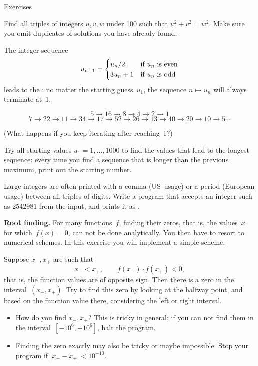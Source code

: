  {Exercises}

\begin{exercise}
  \label{ex:pythagoras}
  Find all triples of integers $u,v,w$ under 100 such that
  $u^2+v^2=w^2$. Make sure you omit duplicates of solutions you have
  already found.
\end{exercise}

\begin{exercise}
  \label{ex:collatz}
  The integer sequence
  \[ u_{n+1} = 
  \begin{cases}
    u_n/2&\hbox{if $u_n$ is even}\\
    3u_n+1&\hbox{if $u_n$ is odd}\\
  \end{cases}
  \]
  leads to the : no matter the starting guess~$u_1$,
  the sequence $n\mapsto u_n$ will always terminate at~1.

  { \small
  \[ 5\rightarrow 16\rightarrow 8\rightarrow 4\rightarrow 2\rightarrow 1\]
  \[ 7\rightarrow 22\rightarrow 11\rightarrow 34\rightarrow
  17\rightarrow 52\rightarrow 26\rightarrow 13\rightarrow
  40\rightarrow 20\rightarrow 10\rightarrow 5\cdots \]
  }

  (What happens if you keep iterating after reaching~1?)
  
  Try all starting values $u_1=1,\ldots,1000$ to find the values that
  lead to the longest sequence: every time you find a sequence that is
  longer than the previous maximum, print out the starting number.
\end{exercise}

\begin{exercise}
  \label{ex:mille-comma}
  Large integers are often printed with a comma (US~usage) or a period
  (European usage) between all triples of digits. Write a program that
  accepts an integer such as $2542981$ from the input, and prints it as
  .
\end{exercise}

\begin{exercise}
  \label{ex:rootfind}
  \textbf{Root finding.}
  For many functions~$f$, finding their zeros, that is, the values~$x$
  for which~$f(x)=0$, can not be done analytically. You then have to
  resort to numerical  schemes. In this
  exercise you will implement a simple scheme.

  Suppose $x_-,x_+$ are such that 
  \[ x_-<x_+,\qquad f(x_-)\cdot f(x_+)<0,\]
  that is, the function values are of opposite sign. Then
  there is a zero in the interval~$(x_-,x_+)$. Try to find this zero
  by looking at the halfway point, and based on the function value
  there, considering the left or right interval.
  \begin{itemize}
  \item How do you find $x_-,x_+$? This is tricky in general; if you
    can not find them in the interval~$[-10^6,+10^6]$, halt the program.
  \item Finding the zero exactly may also be tricky or maybe
    impossible. Stop your program if $|x_--x_+|<10^{-10}$.
  \end{itemize}
\end{exercise}

